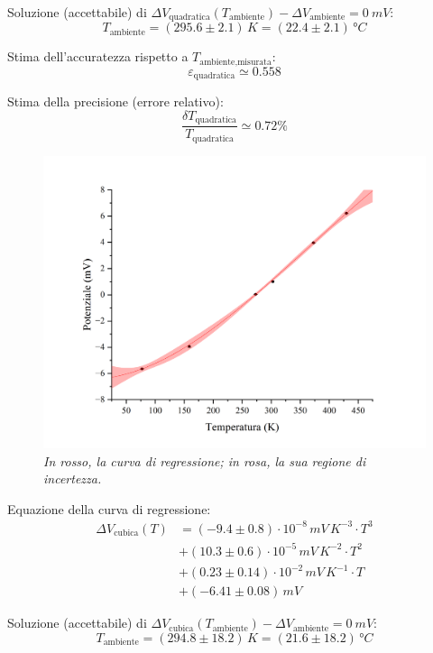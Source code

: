 \documentclass{article}
\begin{document}
Soluzione (accettabile) di $
  \Delta V_\text{quadratica}(T_\text{ambiente}) -
  \Delta V_\text{ambiente} = \qty{0}{mV}$:
\[T_\text{ambiente}
  = (295.6\pm2.1)\,\unit{K}
  = (22.4\pm2.1)\,\unit{\degree C}
\]

Stima dell'accuratezza rispetto a $T_\text{ambiente,misurata}$:
\[ \varepsilon_\text{quadratica} \simeq 0.558 \]

Stima della precisione (errore relativo):
\[ \frac{\delta T_\text{quadratica}}{T_\text{quadratica}} \simeq 0.72\% \]

\pagebreak
\begin{figure}[H]
  \centering
  \includegraphics[trim={2cm 0.6cm 3cm 1cm},clip,width=\textwidth]{img/regressione3.png}
  \caption*{\emph{
    In rosso, la curva di regressione; in rosa, la sua regione di incertezza.
  }}
\end{figure}

Equazione della curva di regressione:
\[\begin{aligned}\Delta V_\text{cubica}(T)
  &= (-9.4\pm0.8)\cdot10^{-8}\,\unit{mV\,K^{-3}}\cdot T^3 \\
  &+ (10.3\pm0.6)\cdot10^{-5}\,\unit{mV\,K^{-2}}\cdot T^2 \\
  &+ (0.23\pm0.14)\cdot10^{-2}\,\unit{mV\,K^{-1}}\cdot T \\
  &+ (-6.41\pm0.08)\,\unit{mV}
\end{aligned}\]

Soluzione (accettabile) di $
  \Delta V_\text{cubica}(T_\text{ambiente}) -
  \Delta V_\text{ambiente} = \qty{0}{mV}$:
\[T_\text{ambiente}
  = (294.8\pm18.2)\,\unit{K}
  = (21.6\pm18.2)\,\unit{\degree C}
\]
\end{document}

